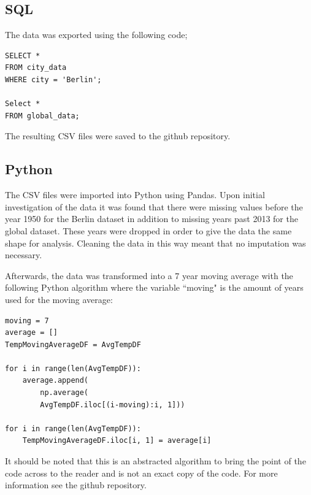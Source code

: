 \documentclass[journal, a4paper]{IEEEtran}
\begin{document}
    \subsection{SQL}
    
    The data was exported using the following code;
    
    \begin{small}
    \begin{lstlisting}
SELECT *
FROM city_data
WHERE city = 'Berlin';
    
Select *
FROM global_data;
    \end{lstlisting}
    \end{small}
    
    The resulting CSV files were saved to the github repository.
    
    \subsection{Python}
    
    The CSV files were imported into Python using Pandas. Upon initial investigation of the data it was found that there were missing values before the year 1950 for the Berlin dataset in addition to missing years past 2013 for the global dataset. These years were dropped in order to give the data the same shape for analysis. Cleaning the data in this way meant that no imputation was necessary.
    
    Afterwards, the data was transformed into a 7 year moving average with the following Python algorithm where the variable ``moving" is the amount of years used for the moving average:
    
    \begin{small}
    \begin{lstlisting}
moving = 7
average = []
TempMovingAverageDF = AvgTempDF

for i in range(len(AvgTempDF)):
    average.append(
    	np.average(
        AvgTempDF.iloc[(i-moving):i, 1]))
    
for i in range(len(AvgTempDF)):   
	TempMovingAverageDF.iloc[i, 1] = average[i]
    \end{lstlisting}
    \end{small}
    
    It should be noted that this is an abstracted algorithm to bring the point of the code across to the reader and is not an exact copy of the code. For more information see the github repository.
    
\end{document}
